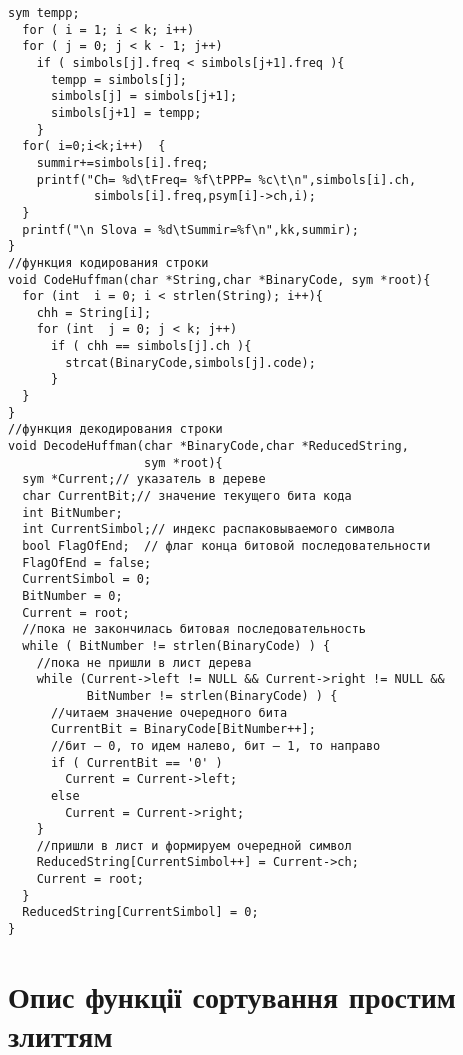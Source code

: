 \begin{lstlisting}[label=code:haff,caption=Програмна реалізація алгоритму Хаффмана]
  sym tempp;
  for ( i = 1; i < k; i++)
  for ( j = 0; j < k - 1; j++)
    if ( simbols[j].freq < simbols[j+1].freq ){
      tempp = simbols[j];
      simbols[j] = simbols[j+1];
      simbols[j+1] = tempp;
    }
  for( i=0;i<k;i++)  {
    summir+=simbols[i].freq; 
    printf("Ch= %d\tFreq= %f\tPPP= %c\t\n",simbols[i].ch,
            simbols[i].freq,psym[i]->ch,i);
  }
  printf("\n Slova = %d\tSummir=%f\n",kk,summir);
}
//функция кодирования строки
void CodeHuffman(char *String,char *BinaryCode, sym *root){
  for (int  i = 0; i < strlen(String); i++){
    chh = String[i];
    for (int  j = 0; j < k; j++)
      if ( chh == simbols[j].ch ){
        strcat(BinaryCode,simbols[j].code);
      }
  }
}
//функция декодирования строки
void DecodeHuffman(char *BinaryCode,char *ReducedString, 
                   sym *root){
  sym *Current;// указатель в дереве
  char CurrentBit;// значение текущего бита кода
  int BitNumber;
  int CurrentSimbol;// индекс распаковываемого символа
  bool FlagOfEnd;  // флаг конца битовой последовательности
  FlagOfEnd = false;
  CurrentSimbol = 0;
  BitNumber = 0;
  Current = root;
  //пока не закончилась битовая последовательность
  while ( BitNumber != strlen(BinaryCode) ) {
    //пока не пришли в лист дерева
    while (Current->left != NULL && Current->right != NULL && 
           BitNumber != strlen(BinaryCode) ) {
      //читаем значение очередного бита
      CurrentBit = BinaryCode[BitNumber++];
      //бит – 0, то идем налево, бит – 1, то направо
      if ( CurrentBit == '0' ) 
        Current = Current->left;
      else 
        Current = Current->right;
    }
    //пришли в лист и формируем очередной символ
    ReducedString[CurrentSimbol++] = Current->ch;
    Current = root;
  }
  ReducedString[CurrentSimbol] = 0;
}
\end{lstlisting}


\section{Опис функції сортування простим злиттям}

